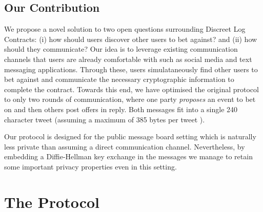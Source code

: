 \documentclass[runningheads]{llncs}
\begin{document}
\subsection{Our Contribution}

We propose a novel solution to two open questions surrounding Discreet Log Contracts: (i) how should users discover other users to bet against? and (ii) how should they communicate? Our idea is to leverage existing communication channels that users are already comfortable with such as social media and text messaging applications. Through these, users simulataneously find other users to bet against and communicate the necessary cryptographic information to complete the contract. Towards this end, we have optimised the original protocol to only two rounds of communication, where one party \emph{proposes} an event to bet on and then others post offers in reply. Both messages fit into a single 240 character tweet (assuming a maximum of 385 bytes per tweet \cite{base2048}).

Our protocol is designed for the public message board setting which is naturally less private than assuming a direct communication channel. Nevertheless, by embedding a Diffie-Hellman key exchange in the messages we manage to retain some important privacy properties even in this setting.

\section{The Protocol}
\newcommand{\Rec}{\textsf{Rec}}
\newcommand{\bet}{\beta}
\newcommand{\hatsigma}{\hat{\sigma}}
\newcommand{\Fund}{\textsf{Fund}}
\newcommand{\Outcome}{\textsf{Outcome}}
\newcommand{\KeyGen}{\textsf{KeyGen}}
\newcommand{\win}{\textsf{win}}
\newcommand{\Verify}{\textsf{Vrfy}}
\newcommand{\Tx}{\textsf{Tx}}
\newcommand{\EncVer}{\textsf{EncVrfy}}
\newcommand{\Pdleq}{\pcalgostyle{P}_{\textsf{DLEQ}}}
\newcommand{\Vdleq}{\pcalgostyle{V}_{\textsf{DLEQ}}}
\newcommand{\change}{\textsf{change}}
\newcommand{\val}{\textsf{val}}
\newcommand{\OPCHECKMULTISIG}{\texttt{OP\_CHECKMULTISIG}}
\newcommand{\OPCMS}{\texttt{OP\_CMS}_{\text{1-of-2}}}
\newcommand{\fee}{\textsf{fee}}
\newcommand{\Sign}{\textsf{Sign}}
\newcommand{\EncSign}{\textsf{EncSign}}
\newcommand{\Rx}{R_\texttt{x}}
\newcommand{\DecSig}{\textsf{DecSig}}
\newcommand{\TxGen}{\textsf{TxGen}}
\newcommand{\eventid}{\textsf{event\_id}}
\newcommand{\PRG}{\textsf{PRG}}
\newcommand{\HKDF}{H_{\textsf{KDF}}}
\newcommand{\G}{\mathbb{G}}
\newcommand{\Enc}{\textsf{Enc}}
\newcommand{\Dec}{\textsf{Dec}}
\newcommand{\VrfyWitness}{\textsf{VerifyWitness}}
\newcommand{\GenFund}{\textsf{GenFund}}
\newcommand{\GenWitness}{\textsf{Witness}}
\newcommand{\Value}{\textsf{Value}}
\end{document}
